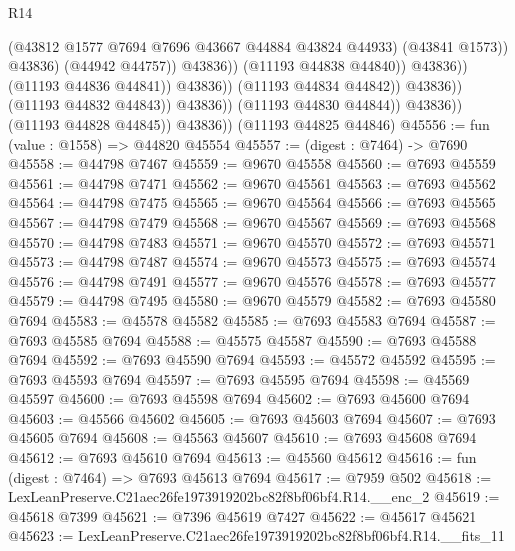 \begin{lexlean}{R14}
\begin{coremodule}
                                                  (@43812
                                                    @1577
                                                    @7694
                                                    @7696
                                                    @43667
                                                    @44884
                                                    @43824
                                                    @44933)
                                                  (@43841 @1573))
                                                @43836)
                                              (@44942 @44757))
                                            @43836))
                                        (@11193 @44838 @44840))
                                      @43836))
                                  (@11193 @44836 @44841))
                                @43836))
                            (@11193 @44834 @44842))
                          @43836))
                      (@11193 @44832 @44843))
                    @43836))
                (@11193 @44830 @44844))
              @43836))
          (@11193 @44828 @44845))
        @43836))
    (@11193 @44825 @44846)
@45556 := fun (value : @1558) => @44820 @45554
@45557 := (digest : @7464) -> @7690
@45558 := @44798 @7467
@45559 := @9670 @45558
@45560 := @7693 @45559
@45561 := @44798 @7471
@45562 := @9670 @45561
@45563 := @7693 @45562
@45564 := @44798 @7475
@45565 := @9670 @45564
@45566 := @7693 @45565
@45567 := @44798 @7479
@45568 := @9670 @45567
@45569 := @7693 @45568
@45570 := @44798 @7483
@45571 := @9670 @45570
@45572 := @7693 @45571
@45573 := @44798 @7487
@45574 := @9670 @45573
@45575 := @7693 @45574
@45576 := @44798 @7491
@45577 := @9670 @45576
@45578 := @7693 @45577
@45579 := @44798 @7495
@45580 := @9670 @45579
@45582 := @7693 @45580 @7694
@45583 := @45578 @45582
@45585 := @7693 @45583 @7694
@45587 := @7693 @45585 @7694
@45588 := @45575 @45587
@45590 := @7693 @45588 @7694
@45592 := @7693 @45590 @7694
@45593 := @45572 @45592
@45595 := @7693 @45593 @7694
@45597 := @7693 @45595 @7694
@45598 := @45569 @45597
@45600 := @7693 @45598 @7694
@45602 := @7693 @45600 @7694
@45603 := @45566 @45602
@45605 := @7693 @45603 @7694
@45607 := @7693 @45605 @7694
@45608 := @45563 @45607
@45610 := @7693 @45608 @7694
@45612 := @7693 @45610 @7694
@45613 := @45560 @45612
@45616 := fun (digest : @7464) => @7693 @45613 @7694
@45617 := @7959 @502
@45618 := LexLeanPreserve.C21aec26fe1973919202bc82f8bf06bf4.R14.__enc_2
@45619 := @45618 @7399
@45621 := @7396 @45619 @7427
@45622 := @45617 @45621
@45623 := LexLeanPreserve.C21aec26fe1973919202bc82f8bf06bf4.R14.__fits_11

\end{coremodule}
\end{lexlean}
